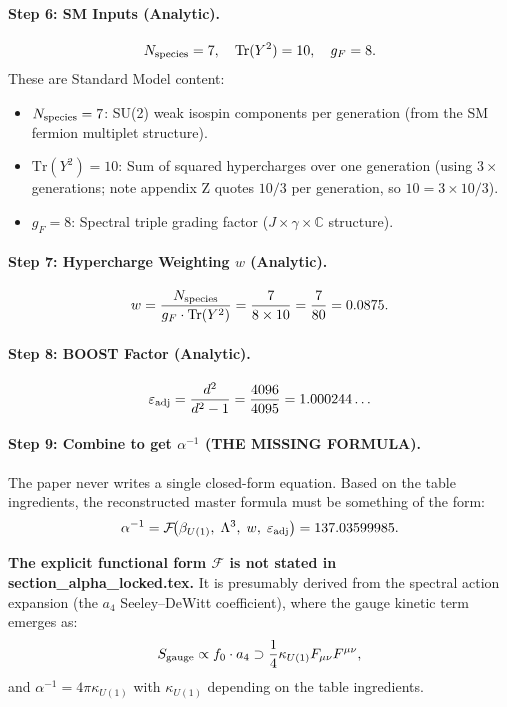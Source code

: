 \paragraph{Step 6: SM Inputs (Analytic).}
\[
  N_{\rm species} = 7, \quad \mathrm{Tr}(Y^2) = 10, \quad g_F = 8.
\]
These are Standard Model content:
\begin{itemize}
  \item $N_{\rm species} = 7$: SU(2) weak isospin components per generation
        (from the SM fermion multiplet structure).
  \item $\mathrm{Tr}(Y^2) = 10$: Sum of squared hypercharges over one generation
        (using $3 \times$ generations; note appendix Z quotes $10/3$ per generation,
        so $10 = 3 \times 10/3$).
  \item $g_F = 8$: Spectral triple grading factor
        ($J \times \gamma \times \mathbb{C}$ structure).
\end{itemize}

\paragraph{Step 7: Hypercharge Weighting $w$ (Analytic).}
\[
  w = \frac{N_{\rm species}}{g_F \cdot \mathrm{Tr}(Y^2)}
  = \frac{7}{8 \times 10} = \frac{7}{80} = 0.0875.
\]

\paragraph{Step 8: BOOST Factor (Analytic).}
\[
  \varepsilon_{\rm adj} = \frac{d^2}{d^2 - 1}
  = \frac{4096}{4095} = 1.000244\ldots
\]

\paragraph{Step 9: Combine to get $\alpha^{-1}$ (THE MISSING FORMULA).}

The paper never writes a single closed-form equation.
Based on the table ingredients, the reconstructed master formula must be
something of the form:
\[
  \alpha^{-1} = \mathcal{F}\!\bigl(\beta_{U(1)},\; \Lambda^3,\; w,\;
  \varepsilon_{\rm adj}\bigr) = 137.03599985.
\]

\textbf{The explicit functional form $\mathcal{F}$ is not stated in
section\_alpha\_locked.tex.} It is presumably derived from the spectral action
expansion (the $a_4$ Seeley--DeWitt coefficient), where the gauge kinetic term
emerges as:
\[
  S_{\rm gauge} \propto f_0 \cdot a_4 \supset
  \frac{1}{4} \kappa_{U(1)} F_{\mu\nu}F^{\mu\nu},
\]
and $\alpha^{-1} = 4\pi \kappa_{U(1)}$ with $\kappa_{U(1)}$ depending on the
table ingredients.


